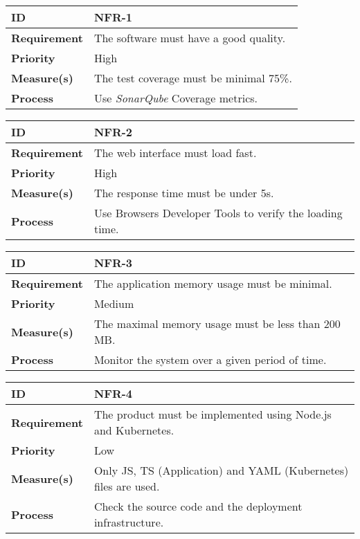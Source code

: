 \begin{center}
\begin{tabular}{ | m{8em} | m{25em}| } 
 \hline
 \textbf{ID} & NFR-1\\ 
 \hline
 \textbf{Requirement} & The software must have a good quality. \\
 \hline
 \textbf{Priority} & High\\
 \hline
 \textbf{Measure(s)} & The test coverage must be minimal 75\%.\\
 \hline
 \textbf{Process} & Use \textit{SonarQube} Coverage metrics. \\
 \hline
\end{tabular}
\end{center}

\begin{center}
\begin{tabular}{ | m{8em} | m{25em}| } 
 \hline
 \textbf{ID} & NFR-2\\ 
 \hline
 \textbf{Requirement} & The web interface must load fast.\\
 \hline
 \textbf{Priority} & High\\
 \hline
 \textbf{Measure(s)} & The response time must be under 5s.\\
 \hline
 \textbf{Process} & Use Browsers Developer Tools to verify the loading time.\\
 \hline
\end{tabular}
\end{center}

\begin{center}
\begin{tabular}{ | m{8em} | m{25em}| } 
 \hline
 \textbf{ID} & NFR-3\\ 
 \hline
 \textbf{Requirement} & The application memory usage must be minimal.\\
 \hline
 \textbf{Priority} & Medium\\
 \hline
 \textbf{Measure(s)} & The maximal memory usage must be less than 200 MB.\\
 \hline
 \textbf{Process} & Monitor the system over a given period of time.\\
 \hline
\end{tabular}
\end{center}

\begin{center}
\begin{tabular}{ | m{8em} | m{25em}| } 
 \hline
 \textbf{ID} & NFR-4\\ 
 \hline
 \textbf{Requirement} & The product must be implemented using Node.js and Kubernetes.\\
 \hline
 \textbf{Priority} & Low\\
 \hline
 \textbf{Measure(s)} & Only JS, TS (Application) and YAML (Kubernetes) files are used.\\
 \hline
 \textbf{Process} & Check the source code and the deployment infrastructure.\\
 \hline
\end{tabular}
\end{center}

